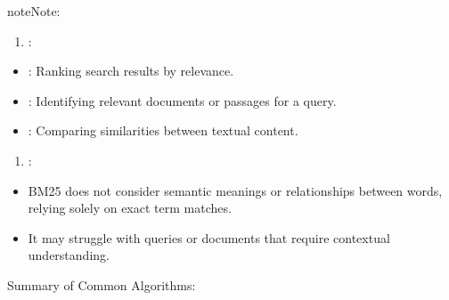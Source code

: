 \documentclass[letterpaper,11pt,english]{sphinxmanual}
\begin{document}
\begin{sphinxadmonition}{note}{Note:}
\begin{itemize}
\begin{itemize}
\end{itemize}
\begin{enumerate}
%
\setcounter{enumi}{3}
\item {} 
\sphinxAtStartPar
{}:

\end{enumerate}
\begin{itemize}
\item {} 
\sphinxAtStartPar
{}: Ranking search results by relevance.

\item {} 
\sphinxAtStartPar
{}: Identifying relevant documents or passages for a query.

\item {} 
\sphinxAtStartPar
{}: Comparing similarities between textual content.

\end{itemize}
\begin{enumerate}
%
\setcounter{enumi}{4}
\item {} 
\sphinxAtStartPar
{}:

\end{enumerate}
\begin{itemize}
\item {} 
\sphinxAtStartPar
BM25 does not consider semantic meanings or relationships between words, relying solely on exact term matches.

\item {} 
\sphinxAtStartPar
It may struggle with queries or documents that require contextual understanding.

\end{itemize}

\end{itemize}
\end{sphinxadmonition}

\sphinxAtStartPar
Summary of Common Algorithms:
\end{document}
